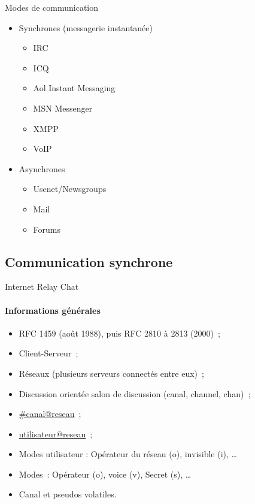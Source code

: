 \begin{frame}{Modes de communication}
 \begin{itemize}[<+->]
  \item Synchrones (messagerie instantanée)
  \begin{itemize}[<+->]
   \item IRC
   \item ICQ
   \item Aol Instant Messaging
   \item MSN Messenger
   \item XMPP
   \item VoIP
  \end{itemize}
  \item Asynchrones
  \begin{itemize}[<+->]
   \item Usenet/Newsgroups
   \item Mail
   \item Forums
  \end{itemize}
 \end{itemize}
\end{frame}

\subsection{Communication synchrone}

\begin{frame}[fragile]{Internet Relay Chat}
\framesubtitle{Informations générales}
\begin{itemize}[<+->]
 \item RFC 1459 (août 1988), puis RFC 2810 à 2813 (2000)~;
 \item Client-Serveur~;
 \item Réseaux (plusieurs serveurs connectés entre eux)~;
 \item Discussion orientée salon de discussion (canal, channel, chan)~;
 \item \url{\#canal@reseau}~;
 \item \url{utilisateur@reseau}~;
 \item Modes utilisateur : Opérateur du réseau (o), invisible (i), \dots
 \item Modes~: Opérateur (o), voice (v), Secret (s), \dots
 \item Canal et pseudos volatiles.
\end{itemize}
\end{frame}

